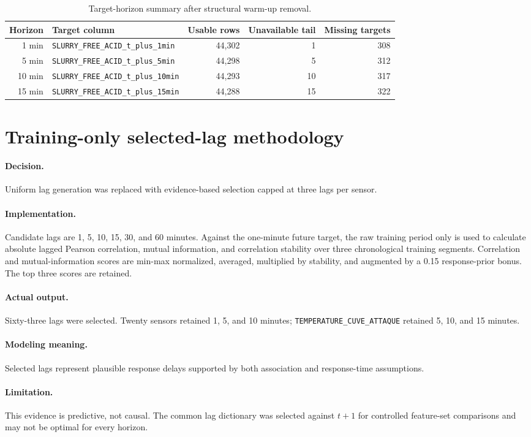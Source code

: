 \documentclass[10pt,a4paper]{article}
\newcommand{\decision}{\paragraph{Decision.}}
\newcommand{\implementation}{\paragraph{Implementation.}}
\newcommand{\actual}{\paragraph{Actual output.}}
\newcommand{\modelmeaning}{\paragraph{Modeling meaning.}}
\newcommand{\limitation}{\paragraph{Limitation.}}
\begin{document}
\begin{table}[H]
\centering
\small
\begin{tabular}{rp{}rrr}
\toprule
Horizon & Target column & Usable rows & Unavailable tail & Missing targets \\
\midrule
1 min & \nolinkurl{SLURRY_FREE_ACID_t_plus_1min} & 44,302 & 1 & 308 \\
5 min & \nolinkurl{SLURRY_FREE_ACID_t_plus_5min} & 44,298 & 5 & 312 \\
10 min & \nolinkurl{SLURRY_FREE_ACID_t_plus_10min} & 44,293 & 10 & 317 \\
15 min & \nolinkurl{SLURRY_FREE_ACID_t_plus_15min} & 44,288 & 15 & 322 \\
\bottomrule
\end{tabular}
\caption{Target-horizon summary after structural warm-up removal.}
\end{table}


\section{Training-only selected-lag methodology}
\decision Uniform lag generation was replaced with evidence-based selection capped at three lags per sensor.
\implementation Candidate lags are 1, 5, 10, 15, 30, and 60 minutes. Against the one-minute future target, the raw training period only is used to calculate absolute lagged Pearson correlation, mutual information, and correlation stability over three chronological training segments. Correlation and mutual-information scores are min-max normalized, averaged, multiplied by stability, and augmented by a 0.15 response-prior bonus. The top three scores are retained.
\actual Sixty-three lags were selected. Twenty sensors retained 1, 5, and 10 minutes; \texttt{TEMPERATURE\_CUVE\_ATTAQUE} retained 5, 10, and 15 minutes.
\modelmeaning Selected lags represent plausible response delays supported by both association and response-time assumptions.
\limitation This evidence is predictive, not causal. The common lag dictionary was selected against $t+1$ for controlled feature-set comparisons and may not be optimal for every horizon.
\end{document}
